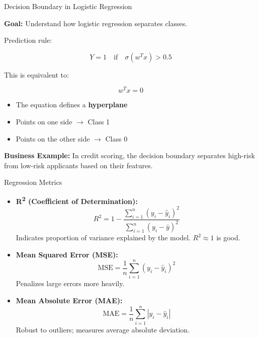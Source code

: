 \documentclass{beamer}
\begin{document}
\begin{frame}{Decision Boundary in Logistic Regression}

\textbf{Goal:} Understand how logistic regression separates classes.

\vspace{0.5cm}

Prediction rule:

\[
Y = 1 
\quad \text{if} \quad 
\sigma(w^T x) > 0.5
\]

This is equivalent to:

\[
w^T x = 0
\]

\begin{itemize}
    \item The equation defines a \textbf{hyperplane}
    \item Points on one side $\rightarrow$ Class 1
    \item Points on the other side $\rightarrow$ Class 0
\end{itemize}

\vspace{0.5cm}

\textbf{Business Example:}  
In credit scoring, the decision boundary separates high-risk from low-risk applicants based on their features.

\end{frame}

\begin{frame}{Regression Metrics}

\begin{itemize}
    \item \textbf{R\textsuperscript{2} (Coefficient of Determination):}
    \[
    R^2 = 1 - \frac{\sum_{i=1}^n (y_i - \hat{y}_i)^2}{\sum_{i=1}^n (y_i - \bar{y})^2}
    \]
    Indicates proportion of variance explained by the model. $R^2 \approx 1$ is good.
    
    \item \textbf{Mean Squared Error (MSE):}
    \[
    \text{MSE} = \frac{1}{n} \sum_{i=1}^n (y_i - \hat{y}_i)^2
    \]
    Penalizes large errors more heavily.
    
    \item \textbf{Mean Absolute Error (MAE):}
    \[
    \text{MAE} = \frac{1}{n} \sum_{i=1}^n |y_i - \hat{y}_i|
    \]
    Robust to outliers; measures average absolute deviation.
\end{itemize}

\end{frame}
\end{document}
